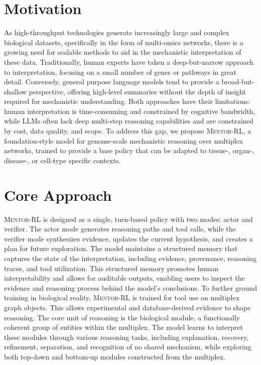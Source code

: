 \documentclass[letterpaper,11pt]{article}
\begin{document}
\section{Motivation}
As high-throughput technologies generate increasingly large and complex biological datasets, specifically in the form of multi-omics networks, there is a growing need for scalable methods to aid in the mechanistic interpretation of these data. Traditionally, human experts have taken a deep-but-narrow approach to interpretation, focusing on a small number of genes or pathways in great detail. Conversely, general purpose language models tend to provide a broad-but-shallow perspective, offering high-level summaries without the depth of insight required for mechanistic understanding. Both approaches have their limitations: human interpretation is time-consuming and constrained by cognitive bandwidth, while LLMs often lack deep multi-step reasoning capabilities and are constrained by cost, data quality, and scope. To address this gap, we propose \textsc{Mentor-RL}, a foundation-style model for genome-scale mechanistic reasoning over multiplex networks, trained to provide a base policy that can be adapted to tissue-, organ-, disease-, or cell-type specific contexts. 

\section{Core Approach}
\textsc{Mentor-RL} is designed as a single, turn-based policy with two modes: actor and verifier. The actor mode generates reasoning paths and tool calls, while the verifier mode synthesizes evidence, updates the current hypothesis, and creates a plan for future exploration. The model maintains a structured memory that captures the state of the interpretation, including evidence, provenance, reasoning traces, and tool utilization. This structured memory promotes human interpretability and allows for auditable outputs, enabling users to inspect the evidence and reasoning process behind the model's conclusions. To further ground training in biological reality, \textsc{Mentor-RL} is trained for tool use on multiplex graph objects. This allows experimental and database-derived evidence to shape reasoning. The core unit of reasoning is the biological module, a functionally coherent group of entities within the multiplex. The model learns to interpret these modules through various reasoning tasks, including explanation, recovery, refinement, separation, and recognition of no shared mechanism, while exploring both top-down and bottom-up modules constructed from the multiplex.
\end{document}
